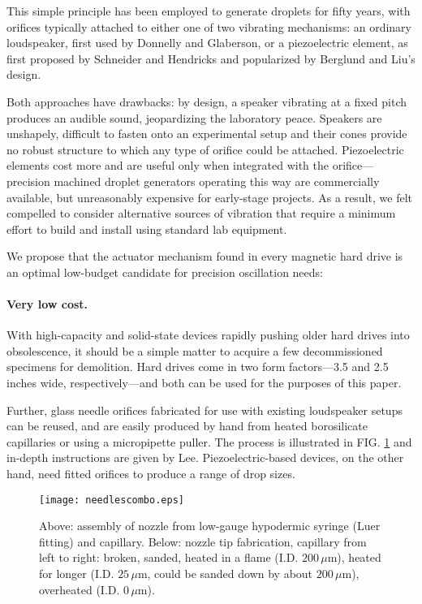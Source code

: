\documentclass[aip,rsi,reprint,graphicx]{revtex4-1} %
\begin{document}
This simple principle has been employed to generate droplets for fifty years,
with orifices typically attached to either one of two vibrating mechanisms: an
ordinary loudspeaker, first used by Donnelly and Glaberson\cite{Donnelly66}, or
a piezoelectric element, as first proposed by Schneider and
Hendricks\cite{Schneider64} and popularized by Berglund and Liu's
design\cite{Berglund73}.

Both approaches have drawbacks: by design, a speaker vibrating at a fixed pitch
produces an audible sound, jeopardizing the laboratory peace. Speakers are unshapely,
difficult to fasten onto an experimental setup and their cones provide no robust
structure to which any type of orifice could be attached. Piezoelectric elements
cost more and are useful only when integrated with the orifice---precision
machined droplet generators operating this way are commercially available, but
unreasonably expensive for early-stage projects. As a result, we felt compelled to
consider alternative sources of vibration that require a minimum effort to build
and install using standard lab equipment.

We propose that the actuator mechanism
found in every magnetic hard drive is an optimal low-budget candidate for
precision oscillation needs:

\paragraph*{Very low cost.} With high-capacity and solid-state devices rapidly pushing older hard drives
into obsolescence, it should be a simple matter to acquire a few decommissioned specimens for
demolition. Hard drives come in two form factors---3.5 and 2.5 inches wide,
respectively---and both can be used for the purposes of this paper. 

Further, glass needle orifices fabricated for use with existing loudspeaker setups can be
reused, and are easily produced by hand from heated borosilicate capillaries or
using a micropipette puller. The process is illustrated in FIG.
\ref{fig:needles} and in-depth instructions are given by Lee\cite{Lee02}.
Piezoelectric-based devices, on the other hand, need fitted orifices to produce a range of
drop sizes.
\begin{figure}
\centering
\texttt{[image: needlescombo.eps]}
\caption{Above: assembly of nozzle from
low-gauge hypodermic syringe (Luer fitting) and capillary. Below: nozzle tip
fabrication, capillary from left to right: broken, sanded, heated in a flame (I.D.
$200\,\mu$m), heated for longer (I.D. $25\,\mu$m, could be sanded down by about
$200\,\mu$m), overheated (I.D. $0\,\mu$m). \label{fig:needles}}
\end{figure}
\end{document}
